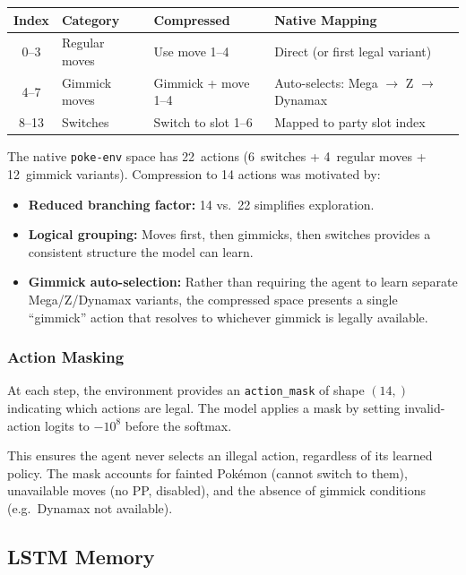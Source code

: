 \begin{center}
\small
\begin{tabularx}{\textwidth}{c l l l}
  \toprule
  \textbf{Index} & \textbf{Category} & \textbf{Compressed} & \textbf{Native Mapping} \\
  \midrule
  0--3  & Regular moves & Use move 1--4    & Direct (or first legal variant) \\
  4--7  & Gimmick moves & Gimmick + move 1--4 & Auto-selects: Mega $\to$ Z $\to$ Dynamax \\
  8--13 & Switches      & Switch to slot 1--6 & Mapped to party slot index \\
  \bottomrule
\end{tabularx}
\end{center}

The native \texttt{poke-env} space has 22~actions (6~switches + 4~regular
moves + 12~gimmick variants).  Compression to 14 actions was motivated by:

\begin{itemize}
  \item \textbf{Reduced branching factor:} 14 vs.\ 22 simplifies exploration.
  \item \textbf{Logical grouping:} Moves first, then gimmicks, then switches
        provides a consistent structure the model can learn.
  \item \textbf{Gimmick auto-selection:} Rather than requiring the agent to
        learn separate Mega/Z/Dynamax variants, the compressed space presents
        a single ``gimmick'' action that resolves to whichever gimmick is
        legally available.
\end{itemize}

\subsubsection{Action Masking}

At each step, the environment provides an \texttt{action\_mask} of shape
$(14,)$ indicating which actions are legal.  The model applies a mask by
setting invalid-action logits to $-10^{8}$ before the softmax.

This ensures the agent never selects an illegal action, regardless of its
learned policy.  The mask accounts for fainted Pok\'{e}mon (cannot switch to
them), unavailable moves (no PP, disabled), and the absence of gimmick
conditions (e.g.\ Dynamax not available).

\subsection{LSTM Memory}

